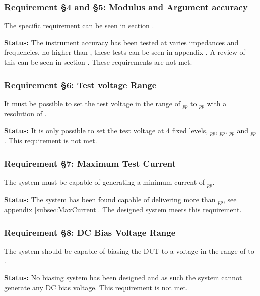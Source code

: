 \subsubsection*{Requirement §4 and §5: Modulus and Argument accuracy}
The specific requirement can be seen in section .

\textbf{Status:} The instrument accuracy has been tested at varies impedances and frequencies, no higher than , these tests can be seen in appendix . A review of this can be seen in section . These requirements are not met.
\nl
\nl

\subsubsection*{Requirement §6: Test voltage Range}
It must be possible to set the test voltage in the range of $_{pp}$ to $_{pp}$ with a resolution of .

\textbf{Status:} It is only possible to set the test voltage at 4 fixed levels, $_{pp}$, $_{pp}$, $_{pp}$ and $_{pp}$. This requirement is not met.
\nl
\nl

\subsubsection*{Requirement §7: Maximum Test Current}
The system must be capable of generating a minimum current of $_{pp}$.

\textbf{Status:} The system has been found capable of delivering more than $_{pp}$, see appendix \ref{subsec:MaxCurrent}. The designed system meets this requirement.
\nl
\nl

\subsubsection*{Requirement §8: DC Bias Voltage Range}
The system should be capable of biasing the DUT to a voltage in the range of  to .

\textbf{Status:} No biasing system has been designed and as such the system cannot generate any DC bias voltage. This requirement is not met.
\nl
\nl

